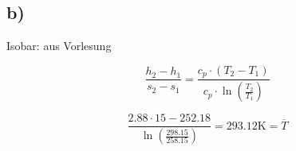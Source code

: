 

\subsection*{b)}
Isobar: aus Vorlesung

\[
\frac{h_2 - h_1}{s_2 - s_1} = \frac{c_p \cdot (T_2 - T_1)}{c_p \cdot \ln \left( \frac{T_2}{T_1} \right)}
\]

\[
\frac{2.88 \cdot 15 - 252.18}{\ln \left( \frac{298.15}{258.15} \right)} = 293.12 \text{K} = \overline{T}
\]